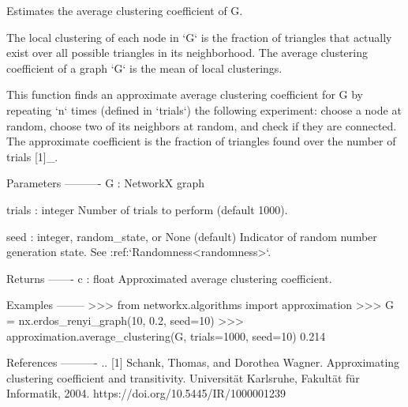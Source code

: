 \begin{DoxyVerb}Estimates the average clustering coefficient of G.

The local clustering of each node in `G` is the fraction of triangles
that actually exist over all possible triangles in its neighborhood.
The average clustering coefficient of a graph `G` is the mean of
local clusterings.

This function finds an approximate average clustering coefficient
for G by repeating `n` times (defined in `trials`) the following
experiment: choose a node at random, choose two of its neighbors
at random, and check if they are connected. The approximate
coefficient is the fraction of triangles found over the number
of trials [1]_.

Parameters
----------
G : NetworkX graph

trials : integer
    Number of trials to perform (default 1000).

seed : integer, random_state, or None (default)
    Indicator of random number generation state.
    See :ref:`Randomness<randomness>`.

Returns
-------
c : float
    Approximated average clustering coefficient.

Examples
--------
>>> from networkx.algorithms import approximation
>>> G = nx.erdos_renyi_graph(10, 0.2, seed=10)
>>> approximation.average_clustering(G, trials=1000, seed=10)
0.214

References
----------
.. [1] Schank, Thomas, and Dorothea Wagner. Approximating clustering
   coefficient and transitivity. Universität Karlsruhe, Fakultät für
   Informatik, 2004.
   https://doi.org/10.5445/IR/1000001239\end{DoxyVerb}
 